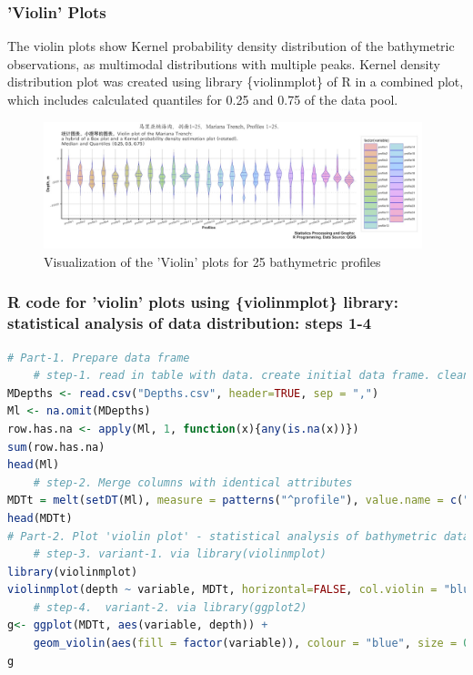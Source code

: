 \documentclass[pdflatex,compress,10pt,
	xcolor={dvipsnames,dvipsnames,svgnames,x11names,table},
	hyperref={colorlinks = true,breaklinks = true, urlcolor = NavyBlue, breaklinks = true}]{beamer}
\begin{document}
\begin{frame}\frametitle{'Violin' Plots}
The violin plots show Kernel probability density distribution of the bathymetric observations, as multimodal distributions with multiple peaks. Kernel density distribution plot was created using library \{violinmplot\} of R in a combined plot, which includes calculated quantiles for 0.25 and 0.75 of the data pool. 
\begin{figure}[H]
	\centering
		\includegraphics[width=11cm]{Fig-2-7.jpg}\caption{Visualization of the 'Violin' plots for 25 bathymetric profiles}
\end{figure}		
\end{frame}

\begin{frame}[fragile]\frametitle{R code for 'violin' plots using \{violinmplot\} library: statistical analysis of data distribution: steps 1-4}
\begin{lstlisting}[language=R]
# Part-1. Prepare data frame
	# step-1. read in table with data. create initial data frame. clean data frame from the NA
MDepths <- read.csv("Depths.csv", header=TRUE, sep = ",")
Ml <- na.omit(MDepths) 
row.has.na <- apply(Ml, 1, function(x){any(is.na(x))}) 
sum(row.has.na) 
head(Ml)
	# step-2. Merge columns with identical attributes
MDTt = melt(setDT(Ml), measure = patterns("^profile"), value.name = c("depth"))
head(MDTt)
# Part-2. Plot 'violin plot' - statistical analysis of bathymetric data distribution (mean, standard deviation, median).
	# step-3. variant-1. via library(violinmplot) 	
library(violinmplot) 
violinmplot(depth ~ variable, MDTt, horizontal=FALSE, col.violin = "blue", main = "Violin plot of the Mariana Trench: a hybrid of a Box plot and a Kernel probability density estimation plot (rotated) + median")
	# step-4.  variant-2. via library(ggplot2) 	
g<- ggplot(MDTt, aes(variable, depth)) +    
	geom_violin(aes(fill = factor(variable)), colour = "blue", size = 0.2, draw_quantiles = c(0.25, 0.5, 0.75), alpha = 0.5, scale = "count", trim = FALSE)
g
\end{lstlisting}
\end{frame}
\end{document}
